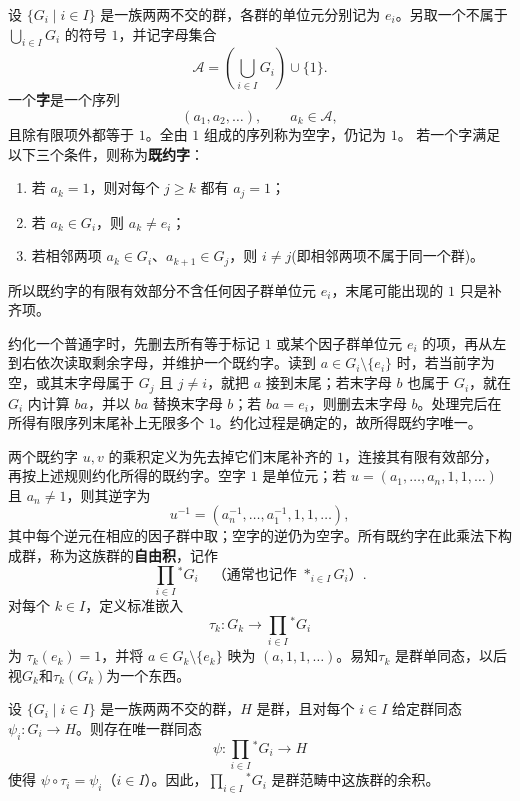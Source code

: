 \begin{definition}[自由积]\label{def:free-product}
设 $\{G_i\mid i\in I\}$ 是一族两两不交的群，各群的单位元分别记为 $e_i$。另取一个不属于 $\bigcup_{i\in I}G_i$ 的符号 $1$，并记字母集合
\[
  \mathcal A=\left(\bigcup_{i\in I}G_i\right)\cup\{1\}.
\]
一个\textbf{字}是一个序列
\[
  (a_1,a_2,\ldots),\qquad a_k\in\mathcal A,
\]
且除有限项外都等于 $1$。全由 $1$ 组成的序列称为空字，仍记为 $1$。
若一个字满足以下三个条件，则称为\textbf{既约字}：
\begin{enumerate}[label=(\arabic*)]
  \item 若 $a_k=1$，则对每个 $j\geq k$ 都有 $a_j=1$；
  \item 若 $a_k\in G_i$，则 $a_k\neq e_i$；
  \item 若相邻两项 $a_k\in G_i$、$a_{k+1}\in G_j$，则 $i\neq j$(即相邻两项不属于同一个群)。
\end{enumerate}
所以既约字的有限有效部分不含任何因子群单位元 $e_i$，末尾可能出现的 $1$ 只是补齐项。

约化一个普通字时，先删去所有等于标记 $1$ 或某个因子群单位元 $e_i$ 的项，再从左到右依次读取剩余字母，并维护一个既约字。读到 $a\in G_i\setminus\{e_i\}$ 时，若当前字为空，或其末字母属于 $G_j$ 且 $j\neq i$，就把 $a$ 接到末尾；若末字母 $b$ 也属于 $G_i$，就在 $G_i$ 内计算 $ba$，并以 $ba$ 替换末字母 $b$；若 $ba=e_i$，则删去末字母 $b$。处理完后在所得有限序列末尾补上无限多个 $1$。约化过程是确定的，故所得既约字唯一。

两个既约字 $u,v$ 的乘积定义为先去掉它们末尾补齐的 $1$，连接其有限有效部分，再按上述规则约化所得的既约字。空字 $1$ 是单位元；若 $u=(a_1,\ldots,a_n,1,1,\ldots)$ 且 $a_n\neq1$，则其逆字为
\[
  u^{-1}=(a_n^{-1},\ldots,a_1^{-1},1,1,\ldots),
\]
其中每个逆元在相应的因子群中取；空字的逆仍为空字。所有既约字在此乘法下构成群，称为这族群的\textbf{自由积}，记作
\[
  \prod_{i\in I}{}^{*}G_i\quad\text{（通常也记作 }\mathop{*}_{i\in I}G_i\text{）}.
\]
对每个 $k\in I$，定义标准嵌入
\[
  \tau_k:G_k\longrightarrow\prod_{i\in I}{}^{*}G_i
\]
为 $\tau_k(e_k)=1$，并将 $a\in G_k\setminus\{e_k\}$ 映为 $(a,1,1,\ldots)$。易知$\tau_k$ 是群单同态，以后视$G_k$和$\tau_k(G_k)$为一个东西。
\end{definition}

\begin{theorem}[自由积的泛性质]\label{thm:free-product-universal-property}
设 $\{G_i\mid i\in I\}$ 是一族两两不交的群，$H$ 是群，且对每个 $i\in I$ 给定群同态 $\psi_i:G_i\to H$。则存在唯一群同态
\[
  \psi:\prod_{i\in I}{}^{*}G_i\longrightarrow H
\]
使得 $\psi\circ\tau_i=\psi_i$（$i\in I$）。因此，$\prod_{i\in I}{}^{*}G_i$ 是群范畴中这族群的余积。
\end{theorem}

